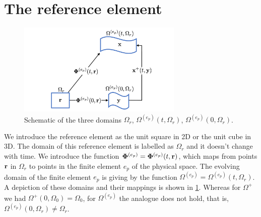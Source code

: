 \documentclass[11pt]{report}
\begin{document}
\section{The reference element}
\begin{figure}[ht]
    \centering
    \includegraphics[width=0.7\textwidth]{../../images/three_spaces.pdf}
    \caption{Schematic of the three domains $\Omega_r$, $\Omega^{(e_p)}(t,\Omega_r)$, $\Omega^{(e_p)}(0,\Omega_r)$.}
    \label{fig:three_spaces}
 \end{figure}
We introduce the reference element as the unit square in 2D or the unit cube in 3D. The domain of this reference element is labelled as $\Omega_r$ and it doesn't change with time. We introduce the function $\bm \Phi^{(e_p)} = \bm \Phi^{(e_p)}(t,\mathbf{r})$, which maps from points $\mathbf{r}$ in $\Omega_r$ to points in the finite element $e_p$ of the physical space. The evolving domain of the finite element $e_p$ is giving  by the function $\Omega^{(e_p)} = \Omega^{(e_p)}(t,\Omega_r)$. A depiction of these domains and their mappings is shown in \cref{fig:three_spaces}. Whereas for $\Omega^+$ we had $\Omega^+(0,\Omega_0)=\Omega_0$, for $\Omega^{(e_p)}$ the analogue does not hold, that is, $\Omega^{(e_p)}(0,\Omega_r) \ne \Omega_r$.
\end{document}
